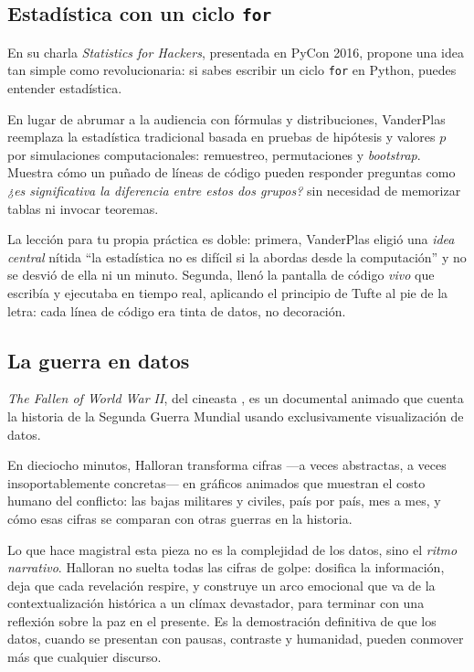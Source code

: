 \subsection*{Estadística con un ciclo \texttt{for}}

En su charla \emph{Statistics for Hackers}, presentada en PyCon 2016,  propone una idea tan simple como revolucionaria: si sabes escribir un ciclo \texttt{for} en Python, puedes entender estadística.

En lugar de abrumar a la audiencia con fórmulas y distribuciones, VanderPlas reemplaza la estadística tradicional basada en pruebas de hipótesis y valores \(p\) por simulaciones computacionales: remuestreo, permutaciones y \emph{bootstrap}.
Muestra cómo un puñado de líneas de código pueden responder preguntas como \emph{¿es significativa la diferencia entre estos dos grupos?} sin necesidad de memorizar tablas ni invocar teoremas.

La lección para tu propia práctica es doble: primera, VanderPlas eligió una \emph{idea central} nítida “la estadística no es difícil si la abordas desde la computación” y no se desvió de ella ni un minuto.
Segunda, llenó la pantalla de código \emph{vivo} que escribía y ejecutaba en tiempo real, aplicando el principio de Tufte al pie de la letra: cada línea de código era tinta de datos, no decoración.

\subsection*{La guerra en datos}

\emph{The Fallen of World War II}, del cineasta , es un documental animado que cuenta la historia de la Segunda Guerra Mundial usando exclusivamente visualización de datos.

En dieciocho minutos, Halloran transforma cifras —a veces abstractas, a veces insoportablemente concretas— en gráficos animados que muestran el costo humano del conflicto: las bajas militares y civiles, país por país, mes a mes, y cómo esas cifras se comparan con otras guerras en la historia.

Lo que hace magistral esta pieza no es la complejidad de los datos, sino el \emph{ritmo narrativo}.
Halloran no suelta todas las cifras de golpe: dosifica la información, deja que cada revelación respire, y construye un arco emocional que va de la contextualización histórica a un clímax devastador, para terminar con una reflexión sobre la paz en el presente.
Es la demostración definitiva de que los datos, cuando se presentan con pausas, contraste y humanidad, pueden conmover más que cualquier discurso.

